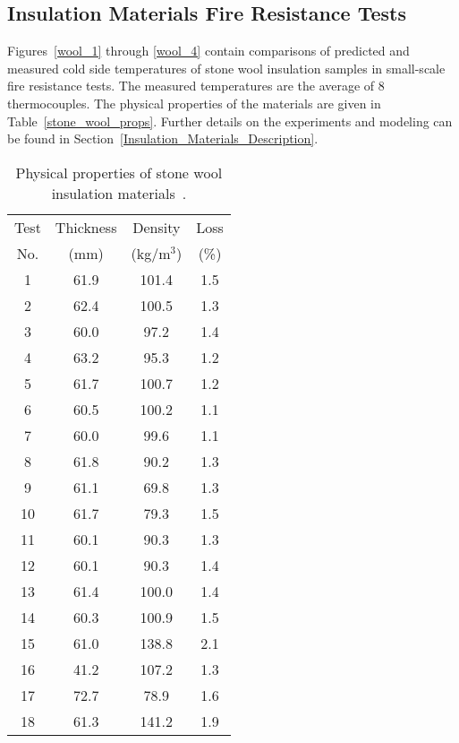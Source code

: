\clearpage

\subsection{Insulation Materials Fire Resistance Tests}

Figures~\ref{wool_1} through \ref{wool_4} contain comparisons of predicted and measured cold side temperatures of stone wool insulation samples in small-scale fire resistance tests. The measured temperatures are the average of 8 thermocouples. The physical properties of the materials are given in Table~\ref{stone_wool_props}. Further details on the experiments and modeling can be found in Section~\ref{Insulation_Materials_Description}.

\begin{table}[ht]
\caption[Property of Insulation Materials]
{Physical properties of stone wool insulation materials~\cite{Paudel:2020}.}
\begin{center}
\begin{tabular}{|c|c|c|c|}
\hline
Test & Thickness & Density    & Loss  \\
No.  & (mm)      & (kg/m$^3$) & (\%)  \\ \hline \hline
1  & 61.9  & 101.4  & 1.5  \\ \hline
2  & 62.4  & 100.5  & 1.3  \\ \hline
3  & 60.0  & 97.2   & 1.4  \\ \hline
4  & 63.2  & 95.3   & 1.2  \\ \hline
5  & 61.7  & 100.7  & 1.2  \\ \hline
6  & 60.5  & 100.2  & 1.1  \\ \hline
7  & 60.0  & 99.6   & 1.1  \\ \hline
8  & 61.8  & 90.2   & 1.3  \\ \hline
9  & 61.1  & 69.8   & 1.3  \\ \hline
10 & 61.7  & 79.3   & 1.5  \\ \hline
11 & 60.1  & 90.3   & 1.3  \\ \hline
12 & 60.1  & 90.3   & 1.4  \\ \hline
13 & 61.4  & 100.0  & 1.4  \\ \hline
14 & 60.3  & 100.9  & 1.5  \\ \hline
15 & 61.0  & 138.8  & 2.1  \\ \hline
16 & 41.2  & 107.2  & 1.3  \\ \hline
17 & 72.7  & 78.9   & 1.6  \\ \hline
18 & 61.3  & 141.2  & 1.9  \\ \hline

\end{tabular}
\end{center}
\end{table}
